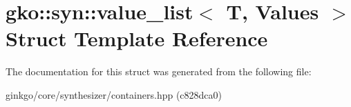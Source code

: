 \hypertarget{structgko_1_1syn_1_1value__list}{}\section{gko\+:\+:syn\+:\+:value\+\_\+list$<$ T, Values $>$ Struct Template Reference}
\label{structgko_1_1syn_1_1value__list}


The documentation for this struct was generated from the following file\+:\begin{DoxyCompactItemize}
\item 
ginkgo/core/synthesizer/containers.\+hpp (c828dca0)\end{DoxyCompactItemize}
